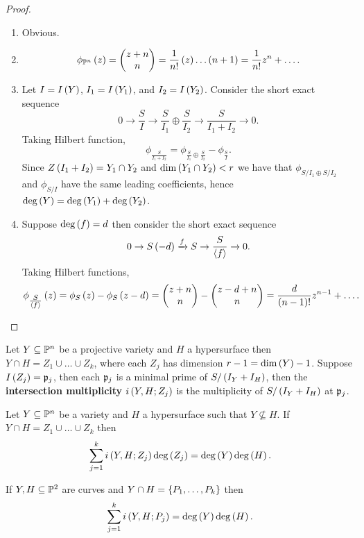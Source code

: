 \begin{proof}
\hfill
\begin{enumerate}
\item Obvious.
\item
$$ \phi_{\P^n}\rb{z} = \twobyone{z + n}{n} = \dfrac{1}{n!}\rb{z} \dots \rb{n + 1} = \dfrac{1}{n!}z^n + \dots. $$
\item Let $ I = I\rb{Y} $, $ I_1 = I\rb{Y_1} $, and $ I_2 = I\rb{Y_2} $. Consider the short exact sequence
$$ 0 \to \dfrac{S}{I} \to \dfrac{S}{I_1} \oplus \dfrac{S}{I_2} \to \dfrac{S}{I_1 + I_2} \to 0. $$
Taking Hilbert function,
$$ \phi_{\tfrac{S}{I_1 + I_2}} = \phi_{\tfrac{S}{I_1} \oplus \tfrac{S}{I_2}} - \phi_{\tfrac{S}{I}}. $$
Since $ Z\rb{I_1 + I_2} = Y_1 \cap Y_2 $ and $ \dim\rb{Y_1 \cap Y_2} < r $ we have that $ \phi_{S / I_1 \oplus S / I_2} $ and $ \phi_{S / I} $ have the same leading coefficients, hence $ \deg\rb{Y} = \deg\rb{Y_1} + \deg\rb{Y_2} $.
\item Suppose $ \deg\rb{f} = d $ then consider the short exact sequence
$$ 0 \to S\rb{-d} \xrightarrow{f}{S} \to \dfrac{S}{\ab{f}} \to 0. $$
Taking Hilbert functions,
$$ \phi_{\tfrac{S}{\ab{f}}}\rb{z} = \phi_S\rb{z} - \phi_S\rb{z - d} = \twobyone{z + n}{n} - \twobyone{z - d + n}{n} = \dfrac{d}{\rb{n - 1}!}z^{n - 1} + \dots. $$
\end{enumerate}
\end{proof}


Let $ Y \subseteq \P^n $ be a projective variety and $ H $ a hypersurface then $ Y \cap H = Z_1 \cup \dots \cup Z_k $, where each $ Z_j $ has dimension $ r - 1 = \dim\rb{Y} - 1 $. Suppose $ I\rb{Z_j} = \pp_j $, then each $ \pp_j $ is a minimal prime of $ S / \rb{I_Y + I_H} $, then the \textbf{intersection multiplicity} $ i\rb{Y, H; Z_j} $ is the multiplicity of $ S / \rb{I_Y + I_H} $ at $ \pp_j $.

\begin{theorem}
Let $ Y \subseteq \P^n $ be a variety and $ H $ a hypersurface such that $ Y \nsubseteq H $. If $ Y \cap H = Z_1 \cup \dots \cup Z_k $ then
$$ \sum_{j = 1}^k i\rb{Y, H; Z_j}\deg\rb{Z_j} = \deg\rb{Y}\deg\rb{H}. $$
\end{theorem}

\begin{corollary}
If $ Y, H \subseteq \P^2 $ are curves and $ Y \cap H = \cb{P_1, \dots, P_k} $ then
$$ \sum_{j = 1}^k i\rb{Y, H; P_j} = \deg\rb{Y}\deg\rb{H}. $$
\end{corollary}

